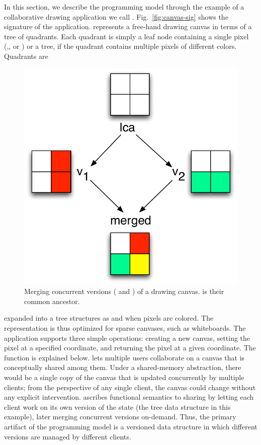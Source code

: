 In this section, we describe the \name programming model through the
example of a collaborative drawing application we call \drawsome.
Fig.~\ref{fig:canvas-sig} shows the signature of the \drawsome
application. \drawsome represents a free-hand drawing canvas in terms
of a tree of quadrants.  Each quadrant is simply a leaf node
containing a single pixel (,, or ) or a tree, if the
quadrant contains multiple pixels of different colors. Quadrants are
\begin{figure}
\centering
\includegraphics[scale=0.43]{Figures/canvas-merging}
\caption{Merging concurrent versions ( and ) of a drawing
canvas.  is their common ancestor.}
\label{fig:canvas-merging}
\end{figure}
expanded into a tree structures as and when pixels are colored.  The
representation is thus optimized for sparse canvases, such as
whiteboards. The application supports three simple operations:
creating a new canvas, setting the pixel at a specified coordinate,
and returning the pixel at a given coordinate. The  function
is explained below.  \drawsome lets multiple users collaborate on a
canvas that is conceptually shared among them. Under a shared-memory
abstraction, there would be a single copy of the canvas that is
updated concurrently by multiple clients; from the perspective of any
single client, the canvas could change without any explicit
intervention. \name ascribes functional semantics to sharing by
letting each client work on its own version of the state (the tree
data structure in this example), later merging concurrent versions
on-demand.  Thus, the primary artifact of the \name programming model
is a versioned data structure in which different versions are managed
by different clients.

